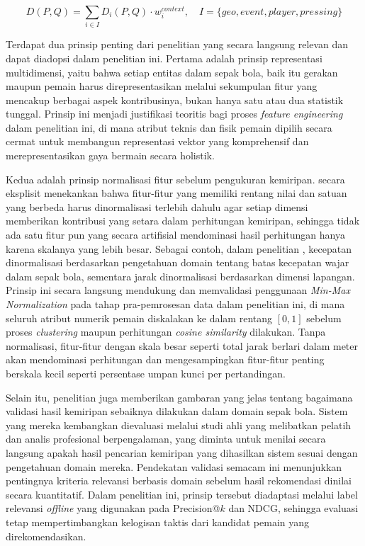 \begin{equation}
  D(P, Q) = \sum_{i \in I} D_i(P, Q) \cdot w_i^{context},
  \quad I = \{geo, event, player, pressing\}
  \label{eq:stein-distance}
\end{equation}

Terdapat dua prinsip penting dari penelitian \textcite{stein2019} yang secara langsung relevan dan dapat diadopsi dalam penelitian ini. Pertama adalah prinsip representasi multidimensi, yaitu bahwa setiap entitas dalam sepak bola, baik itu gerakan maupun pemain harus direpresentasikan melalui sekumpulan fitur yang mencakup berbagai aspek kontribusinya, bukan hanya satu atau dua statistik tunggal. Prinsip ini menjadi justifikasi teoritis bagi proses \emph{feature engineering} dalam penelitian ini, di mana atribut teknis dan fisik pemain dipilih secara cermat untuk membangun representasi vektor yang komprehensif dan merepresentasikan gaya bermain secara holistik.

Kedua adalah prinsip normalisasi fitur sebelum pengukuran kemiripan. \textcite{stein2019} secara eksplisit menekankan bahwa fitur-fitur yang memiliki rentang nilai dan satuan yang berbeda harus dinormalisasi terlebih dahulu agar setiap dimensi memberikan kontribusi yang setara dalam perhitungan kemiripan, sehingga tidak ada satu fitur pun yang secara artifisial mendominasi hasil perhitungan hanya karena skalanya yang lebih besar. Sebagai contoh, dalam penelitian \textcite{stein2019}, kecepatan dinormalisasi berdasarkan pengetahuan domain tentang batas kecepatan wajar dalam sepak bola, sementara jarak dinormalisasi berdasarkan dimensi lapangan. Prinsip ini secara langsung mendukung dan memvalidasi penggunaan \emph{Min-Max Normalization} pada tahap pra-pemrosesan data dalam penelitian ini, di mana seluruh atribut numerik pemain diskalakan ke dalam rentang $[0, 1]$ sebelum proses \emph{clustering} maupun perhitungan \emph{cosine similarity} dilakukan. Tanpa normalisasi, fitur-fitur dengan skala besar seperti total jarak berlari dalam meter akan mendominasi perhitungan dan mengesampingkan fitur-fitur penting berskala kecil seperti persentase umpan kunci per pertandingan.

Selain itu, penelitian \textcite{stein2019} juga memberikan gambaran yang jelas tentang bagaimana validasi hasil kemiripan sebaiknya dilakukan dalam domain sepak bola. Sistem yang mereka kembangkan dievaluasi melalui studi ahli yang melibatkan pelatih dan analis profesional berpengalaman, yang diminta untuk menilai secara langsung apakah hasil pencarian kemiripan yang dihasilkan sistem sesuai dengan pengetahuan domain mereka. Pendekatan validasi semacam ini menunjukkan pentingnya kriteria relevansi berbasis domain sebelum hasil rekomendasi dinilai secara kuantitatif. Dalam penelitian ini, prinsip tersebut diadaptasi melalui label relevansi \emph{offline} yang digunakan pada Precision@$k$ dan NDCG, sehingga evaluasi tetap mempertimbangkan kelogisan taktis dari kandidat pemain yang direkomendasikan.


